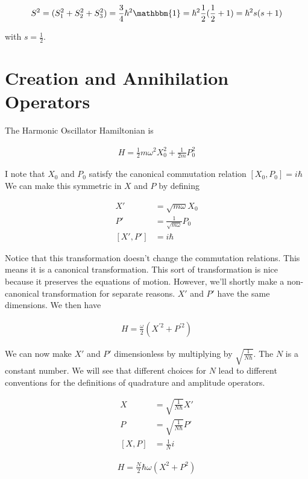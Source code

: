 \documentclass[12pt]{article}
\begin{document}
\begin{align}
S^2 = (S_1^2+S_2^2+S_3^2) = \frac{3}{4}\hbar^2 \mathbbm{1} = \hbar^2 \frac{1}{2}(\frac{1}{2}+1) = \hbar^2s(s+1)
\end{align}

with $s=\frac{1}{2}$.


\section{Creation and Annihilation Operators}

The Harmonic Oscillator Hamiltonian is

\begin{align}
H = \frac{1}{2}m\omega^2X_0^2 + \frac{1}{2m}P_0^2
\end{align}

I note that $X_0$ and $P_0$ satisfy the canonical commutation relation $[X_0,P_0] = i\hbar$
We can make this symmetric in $X$ and $P$ by defining 

\begin{align}
X' &= \sqrt{m\omega}X_0\\
P' &= \frac{1}{\sqrt{m\omega}} P_0\\
[X', P'] &= i\hbar
\end{align}

Notice that this transformation doesn't change the commutation relations. This means it is a canonical transformation. This sort of transformation is nice because it preserves the equations of motion. However, we'll shortly make a non-canonical transformation for separate reasons. $X'$ and $P'$ have the same dimensions.
We then have

\begin{align}
H = \frac{\omega}{2}(X^{'2}+P^{'2})
\end{align}

We can now make $X'$ and $P'$ dimensionless by multiplying by $\sqrt{\frac{1}{N\hbar}}$. The $N$ is a constant number. We will see that different choices for $N$ lead to different conventions for the definitions of quadrature and amplitude operators.

\begin{align}
X &= \sqrt{\frac{1}{N\hbar}} X'\\
P &= \sqrt{\frac{1}{N\hbar}} P'\\
[X, P] &= \frac{1}{N} i
\end{align}

\begin{align}
H = \frac{N}{2}\hbar \omega(X^2 + P^2)
\end{align}
\end{document}
